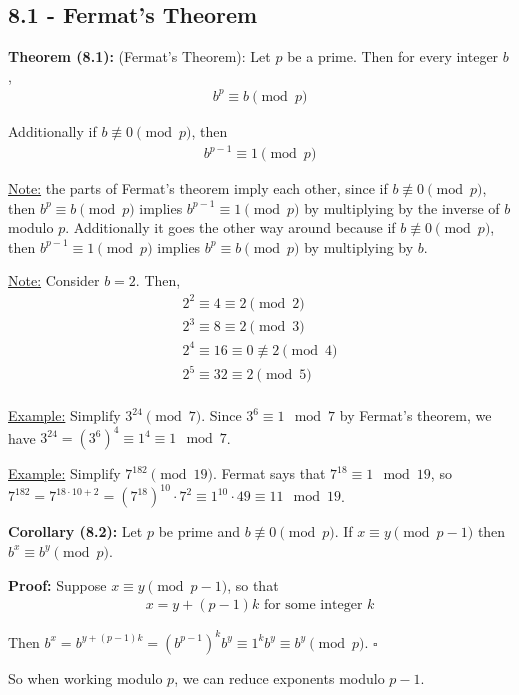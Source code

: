 \documentclass{article}
\newcommand*{\qed}{\hfill$\square$}%
\begin{document}
\subsection{8.1 - Fermat's Theorem}

\textbf{Theorem (8.1):} (Fermat's Theorem): Let $p$ be a prime. Then for every integer $b$, \begin{align*}
    b^p\equiv b\pmod p
\end{align*}

Additionally if $b\not\equiv 0\pmod p$, then \begin{align*}
    b^{p-1}\equiv 1\pmod p
\end{align*}

\underline{Note:} the parts of Fermat's theorem imply each other, since if $b\not\equiv 0\pmod p$, then $b^p\equiv b\pmod p$ implies $b^{p-1}\equiv 1\pmod p$ by multiplying by the inverse of $b$ modulo $p$. Additionally it goes the other way around because if $b\not\equiv 0\pmod p$, then $b^{p-1}\equiv 1\pmod p$ implies $b^p\equiv b\pmod p$ by multiplying by $b$.

\underline{Note:} Consider $b=2$. Then, \begin{align*}
    2^2\equiv 4\equiv 2\pmod 2\\
    2^3\equiv 8\equiv 2\pmod 3\\
    2^4\equiv 16\equiv 0\not\equiv 2\pmod 4\\
    2^5\equiv 32\equiv 2\pmod 5\\
\end{align*}

\underline{Example:} Simplify $3^{24}\pmod 7$. Since $3^6\equiv 1\mod 7$ by Fermat's theorem, we have $3^{24}=(3^6)^4\equiv 1^4\equiv 1\mod 7$.

\underline{Example:} Simplify $7^{182}\pmod{19}$. Fermat says that $7^{18}\equiv 1\mod 19$, so $7^{182}=7^{18\cdot 10+2}=(7^{18})^{10}\cdot 7^2\equiv 1^{10}\cdot 49\equiv 11\mod 19$.

\textbf{Corollary (8.2):} Let $p$ be prime and $b\not\equiv 0\pmod p$. If $x\equiv y\pmod{p-1}$ then $b^x\equiv b^y\pmod p$.

\textbf{Proof:} Suppose $x\equiv y\pmod{p-1}$, so that \begin{align*}
    x=y+(p-1)k\text{ for some integer } k
\end{align*}

Then $b^x=b^{y+(p-1)k}=(b^{p-1})^kb^y\equiv 1^kb^y\equiv b^y\pmod p$. \qed

So when working modulo $p$, we can reduce exponents modulo $p-1$.
\end{document}

